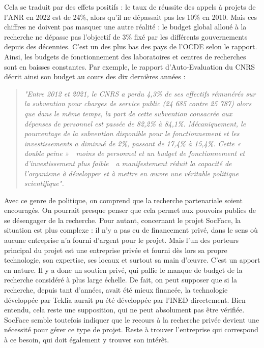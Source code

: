 Cela se traduit par des effets positifs : le taux de réussite des appels à projets de l’ANR en 2022 est de 24\%, alors qu’il ne dépassait pas les 10\% en 2010. Mais ces chiffres ne doivent pas masquer une autre réalité : le budget global alloué à la recherche ne dépasse pas l’objectif de 3\% fixé par les différents gouvernements depuis des décennies. C’est un des plus bas des pays de l’OCDE selon le rapport. Ainsi, les budgets de fonctionnement des laboratoires et centres de recherches sont en baisses constantes. Par exemple, le rapport d’Auto-Evaluation du CNRS décrit ainsi son budget au cours des dix dernières années : 

\begin{quote}
\textit{"Entre 2012 et 2021, le CNRS a perdu 4,3\% de ses effectifs rémunérés sur la subvention pour charges de service public (24 685 contre 25 787) alors que dans le même temps, la part de cette subvention consacrée aux dépenses de personnel est passée de 82,2\% à 84,1\%. Mécaniquement, le pourcentage de la subvention disponible pour le fonctionnement et les investissements a diminué de 2\%, passant de 17,4\% à 15,4\%. Cette « double peine »  moins de personnel et un budget de fonctionnement et d'investissement plus faible  a manifestement réduit la capacité de l'organisme à développer et à mettre en œuvre une véritable politique scientifique".}  
\end{quote}

Avec ce genre de politique, on comprend que la recherche partenariale soient encouragés. On pourrait presque penser que cela permet aux pouvoirs publics de se désengager de la recherche. Pour autant, concernant le projet SocFace, la situation est plus complexe : il n’y a pas eu de financement privé, dans le sens où aucune entreprise n’a fourni d’argent pour le projet. Mais l’un des porteurs principal du projet est une entreprise privée et fourni dès lors sa propre technologie, son expertise, ses locaux et surtout sa main d’œuvre. C'est un apport en nature. Il y a donc un soutien privé, qui pallie le manque de budget de la recherche considéré à plus large échelle. De fait, on peut supposer que si la recherche, depuis tant d’années, avait été mieux financée, la technologie développée par Teklia aurait pu été développée par l’INED directement. Bien entendu, cela reste une supposition, qui ne peut absolument pas être vérifiée.\\ 

SocFace semble toutefois indiquer que le recours à la recherche privée devient une nécessité pour gérer ce type de projet. Reste à trouver l’entreprise qui correspond à ce besoin, qui doit également y trouver son intérêt. 

